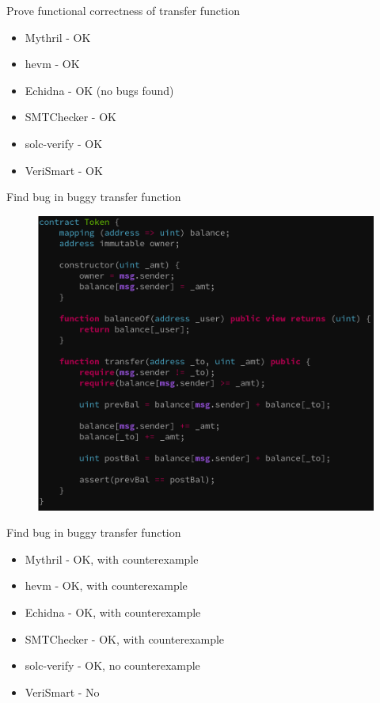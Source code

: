 \documentclass[aspectratio=169,10pt]{beamer}
\begin{document}
\begin{frame}[fragile]
\begin{center}
Prove functional correctness of transfer function
\begin{itemize}
\item Mythril - OK
\item hevm - OK
\item Echidna - OK (no bugs found)
\item SMTChecker - OK
\item solc-verify - OK
\item VeriSmart - OK
\end{itemize}
\end{center}
\end{frame}

\begin{frame}[fragile]
\begin{center}
Find bug in buggy transfer function
\begin{figure}
	\includegraphics[scale=0.25]{images/token_fail}
\end{figure}
\end{center}
\end{frame}

\begin{frame}[fragile]
\begin{center}
Find bug in buggy transfer function
\begin{itemize}
\item Mythril - OK, with counterexample
\item hevm - OK, with counterexample
\item Echidna - OK, with counterexample
\item SMTChecker - OK, with counterexample
\item solc-verify - OK, no counterexample
\item VeriSmart - No
\end{itemize}
\end{center}
\end{frame}
\end{document}
